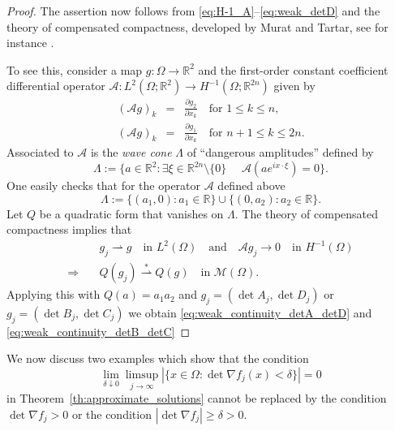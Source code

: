 \documentclass[titlepage]{amsart}
\numberwithin{equation}{section}
\theoremstyle{plain}
\theoremstyle{definition}
\theoremstyle{remark}
\newcommand{\R}{\mathbb{R}}
\newcommand{\g}{\nabla }
\begin{document}
\begin{proof}
 The assertion now follows from  \eqref{eq:H-1_A}--\eqref{eq:weak_detD}  and the theory of compensated compactness, developed by
  Murat and Tartar,
  see for instance
  \cite{murat77, murat78,  tartar79, tartar15}.
  
 To see this, consider a map $g: \Omega \to \R^2$ and the first-order constant coefficient differential operator
 $\mathcal A: L^2(\Omega; \R^2) \to H^{-1}(\Omega; \R^{2n})$ given by
 \begin{eqnarray*}(\mathcal A g)_k &=& \frac{\partial g_2}{\partial x_k} \quad \text{for $1 \le k \le n$}, \\
  (\mathcal A g)_k &=& \frac{\partial g_1}{\partial x_k} \quad \text{for $n+1 \le k \le 2n$.}
  \end{eqnarray*}
  Associated to $\mathcal A$ is the \emph{wave cone} $\Lambda$ of ``dangerous amplitudes'' defined by
  $$ \Lambda := \{ a \in \R^2 :  \exists \xi \in \R^{2n} \setminus \{ 0\} \, \,  \quad  \mathcal A (a e^{i x \cdot \xi}) = 0 \}.$$
  One easily checks that for the operator $\mathcal A$ defined above
  $$ \Lambda:= \{ (a_1, 0) : a_1 \in \R \} \cup \{ (0, a_2) : a_2 \in \R \}. $$
  Let $Q$ be a quadratic form that vanishes on $\Lambda$. The theory of compensated  compactness 
  implies that  \cite[Thm. 11]{tartar79}
  \begin{align*}
 & \quad  g_j \rightharpoonup   g \quad \text{in $L^2(\Omega)$}  \quad \text{and} \quad  \mathcal A g_j \to 0  \quad  \text{in $H^{-1}(\Omega)$} \\
  \Longrightarrow & \quad 
   Q(g_j) \overset{*}{\rightharpoonup} Q(g) \quad \text{in $\mathcal M(\Omega)$.}
\end{align*} 
Applying this with $Q(a) = a_1 a_2$ and $g_j = (\det A_j, \det D_j)$ or $g_j = (\det B_j, \det C_j)$ we obtain
\eqref{eq:weak_continuity_detA_detD} and \eqref{eq:weak_continuity_detB_detC}
\end{proof}

\bigskip



We now discuss two examples which show that
 the condition  
$$
\lim_{\delta \downarrow 0} \limsup_{j \to \infty}  | \{ x \in \Omega : \det \g f_j(x) < \delta \}| = 0
$$
 in   Theorem~\ref{th:approximate_solutions}  
 cannot be replaced by the condition 
$\det \g f_j > 0$ or the condition $|\det \g f_j| \ge \delta > 0$.
\end{document}
